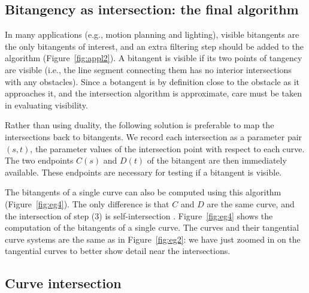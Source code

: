 \documentclass[12pt]{article}
\begin{document}

\subsection{Bitangency as intersection: the final algorithm}

In many applications (e.g., motion planning and lighting),
visible bitangents are the only bitangents of interest,
and an extra filtering step should be added to the algorithm (Figure~\ref{fig:appl2}).
A bitangent is visible if its two points of tangency
are visible (i.e., the line segment connecting them
has no interior intersections with any obstacles).
Since a botangent is by definition close to the 
obstacle as it approaches it, and the intersection algorithm is approximate,
care must be taken in evaluating visibility.

Rather than using duality, the following solution is preferable
	to map the intersections back to bitangents. 
	We record each intersection as a parameter pair $(s,t)$,
	the parameter values of the intersection point with respect to each curve.
	The two endpoints $C(s)$ and $D(t)$ of the bitangent are then immediately 
	available.
	These endpoints are necessary for testing if a bitangent is visible.

The bitangents of a single curve can also be computed using this algorithm
(Figure~\ref{fig:eg4}).
The only difference is that $C$ and $D$ are the same curve,
and the intersection of step (3) is self-intersection \cite{lasser89}.
Figure~\ref{fig:eg4} shows the computation of the bitangents of a single curve.
The curves and their tangential curve systems are the same as in Figure~\ref{fig:eg2}:
we have just zoomed in on the tangential curves to better show detail
near the intersections.

\begin{figure*}
\caption{Bitangents of a single curve}
\label{fig:eg4}
\end{figure*}


\subsection{Curve intersection}
\label{sec:intersect}
\end{document}
